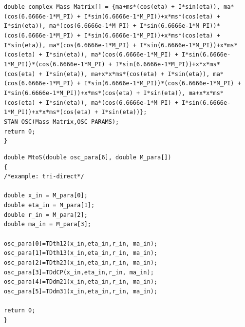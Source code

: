 \documentclass[a4paper,11pt]{article}
\begin{document}
    \texttt{double complex Mass\_Matrix[] = \{ma+ms*(cos(eta) + I*sin(eta)), ma*(cos(6.6666e-1*M\_PI) + I*sin(6.6666e-1*M\_PI))+x*ms*(cos(eta) + I*sin(eta)), ma*(cos(6.6666e-1*M\_PI) + I*sin(6.6666e-1*M\_PI))*(cos(6.6666e-1*M\_PI) + I*sin(6.6666e-1*M\_PI))+x*ms*(cos(eta) + I*sin(eta)), ma*(cos(6.6666e-1*M\_PI) + I*sin(6.6666e-1*M\_PI))+x*ms*(cos(eta) + I*sin(eta)), ma*(cos(6.6666e-1*M\_PI) + I*sin(6.6666e-1*M\_PI))*(cos(6.6666e-1*M\_PI) + I*sin(6.6666e-1*M\_PI))+x*x*ms*(cos(eta) + I*sin(eta)), ma+x*x*ms*(cos(eta) + I*sin(eta)), ma*(cos(6.6666e-1*M\_PI) + I*sin(6.6666e-1*M\_PI))*(cos(6.6666e-1*M\_PI) + I*sin(6.6666e-1*M\_PI))+x*ms*(cos(eta) + I*sin(eta)), ma+x*x*ms*(cos(eta) + I*sin(eta)), ma*(cos(6.6666e-1*M\_PI) + I*sin(6.6666e-1*M\_PI))+x*x*ms*(cos(eta) + I*sin(eta))\};}\\
    
    \texttt{STAN\_OSC(Mass\_Matrix,OSC\_PARAMS);}\\
    
    \texttt{return 0;}\\
\texttt{\} }






\texttt{double MtoS(double osc\_para[6], double M\_para[])}\\
\texttt{\{}\\
    \texttt{/*example: tri-direct*/}\\
\\    
    \texttt{double x\_in   = M\_para[0];}\\
    \texttt{double eta\_in = M\_para[1];}\\
    \texttt{double r\_in   = M\_para[2];}\\
    \texttt{double ma\_in  = M\_para[3];}\\
\\  
    \texttt{osc\_para[0]=TDth12(x\_in,eta\_in,r\_in, ma\_in);}\\
    \texttt{osc\_para[1]=TDth13(x\_in,eta\_in,r\_in, ma\_in);}\\
    \texttt{osc\_para[2]=TDth23(x\_in,eta\_in,r\_in, ma\_in);}\\
    \texttt{osc\_para[3]=TDdCP(x\_in,eta\_in,r\_in, ma\_in);}\\
    \texttt{osc\_para[4]=TDdm21(x\_in,eta\_in,r\_in, ma\_in);}\\
    \texttt{osc\_para[5]=TDdm31(x\_in,eta\_in,r\_in, ma\_in);}\\
\\    
    \texttt{return 0;}\\
\texttt{\}}\\
\end{document}
